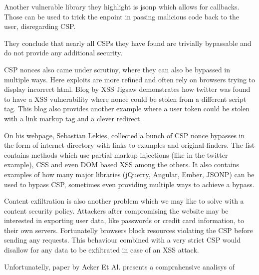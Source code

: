\documentclass[11]{article}   %
\begin{document}
Another vulnerable library they highlight is jsonp which allows for callbacks.
Those can be used to trick the enpoint in passing malicious code back to the user, disregarding CSP.

They conclude that nearly all CSPs they have found are trivially bypassable and do not provide any additional security.

CSP nonces also came under scrutiny, where they can also be bypassed in multiple ways.
Here exploits are more refined and often rely on browsers trying to display incorrect html.
Blog by XSS Jigsaw demonstrates how twitter was found to have a XSS vulnerability where nonce could be stolen from a different script tag. \cite{noncesGoBrrr}
This blog also provides another example where a user token could be stolen with a link markup tag and a clever redirect.

On his webpage, Sebastian Lekies, collected a bunch of CSP nonce bypasses in the form of internet directory with links to examples and original finders. \cite{noncesGoExtinct}
The list contains methods which use partial markup injections (like in the twitter example), CSS and even DOM based XSS among the others.
It also contains examples of how many major libraries (jQuerry, Angular, Ember, JSONP) can be used to bypass CSP, sometimes even providing multiple ways to achieve a bypass.

Content exfiltration is also another problem which we may like to solve with a content security policy.
Attackers after compromising the website may be interested in exporting user data, like passwords or credit card information, to their own servers.
Fortunatelly browsers block resources violating the CSP before sending any requests.
This behaviour combined with a very strict CSP would disallow for any data to be exfiltrated in case of an XSS attack.

Unfortunatelly, paper by Acker Et Al. presents a comprahensive analisys of 
 



\end{document}
